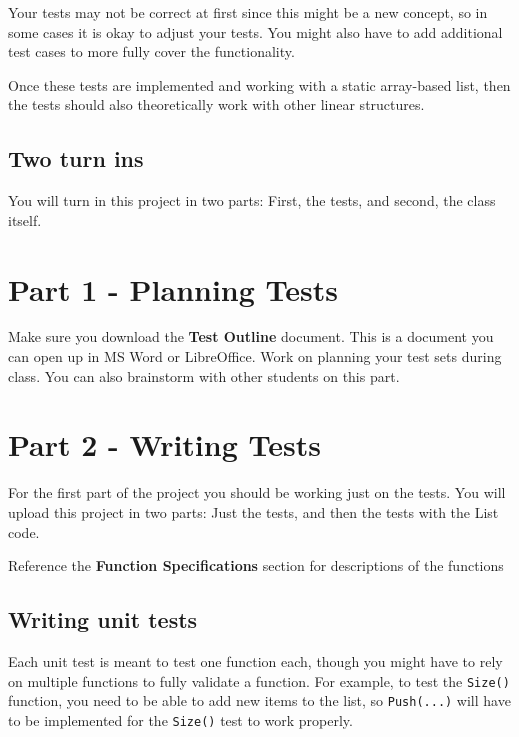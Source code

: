     Your tests may not be correct at first since this might be a new concept,
    so in some cases it is okay to adjust your tests. You might also have to
    add additional test cases to more fully cover the functionality.

    Once these tests are implemented and working with a static array-based
    list, then the tests should also theoretically work with other linear
    structures.

    \subsection{Two turn ins}

    You will turn in this project in two parts: First, the tests, and second,
    the class itself.

    \newpage

    \section{Part 1 - Planning Tests}

    Make sure you download the \textbf{Test Outline} document. This is
    a document you can open up in MS Word or LibreOffice. Work on
    planning your test sets during class. You can also brainstorm
    with other students on this part.

    \newpage
    
    \section{Part 2 - Writing Tests}

    \color{red} For the first part of the project you should be working just on the tests. \color{black}
    You will upload this project in two parts: Just the tests, and then the
    tests with the List code.

    Reference the \textbf{Function Specifications} section for descriptions of the functions

    \subsection{Writing unit tests}

    Each unit test is meant to test one function each, though you might have to rely on
    multiple functions to fully validate a function. For example, to test the \texttt{Size()}
    function, you need to be able to add new items to the list, so \texttt{Push(...)} will have
    to be implemented for the \texttt{Size()} test to work properly.


